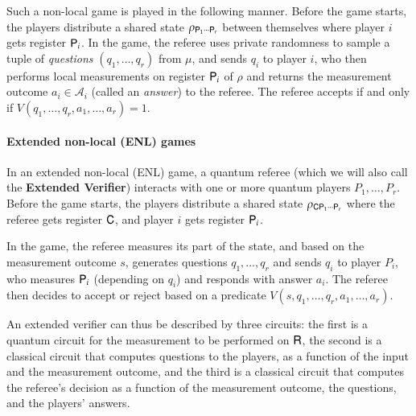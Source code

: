 
Such a non-local game is played in the following manner. Before the game starts, the players distribute a shared state $\rho_{{\mathsf{P}}_1 \cdots {\mathsf{P}}_r}$ between themselves where player $i$ gets register ${\mathsf{P}}_i$. In the game, the referee uses private randomness to sample a tuple of \emph{questions} $(q_1,\ldots,q_r)$ from $\mu$, and sends $q_i$ to player $i$, who then performs local measurements on register ${\mathsf{P}}_i$ of $\rho$ and returns the measurement outcome $a_i \in \mathcal{A}_i$ (called an \emph{answer}) to the referee. The referee accepts if and only if $V(q_1,\ldots,q_r,a_1,\ldots,a_r) = 1$. 


\paragraph{Extended non-local (ENL) games} In an extended non-local (ENL) game, a quantum referee (which we will also call the \textbf{Extended Verifier}) interacts with one or more quantum players $P_1,\ldots,P_r$. Before the game starts, the players distribute a shared state $\rho_{{\mathsf{C}} {\mathsf{P}}_1 \cdots {\mathsf{P}}_r}$ where the referee gets register ${\mathsf{C}}$, and player $i$ gets register ${\mathsf{P}}_i$. 

In the game, the referee measures its part of the state, and based on the measurement outcome $s$, generates questions $q_1,\ldots,q_r$ and sends $q_i$ to player $P_i$, who measures ${\mathsf{P}}_i$ (depending on $q_i$) and  responds with answer $a_i$. The referee then decides to accept or reject based on a predicate $V(s,q_1,\ldots,q_r,a_1,\ldots,a_r)$.

An extended verifier can thus be described by three circuits: the first is a quantum circuit for the measurement to be performed on ${\mathsf{R}}$, the second is a classical circuit that computes questions to the players, as a function of the input and the measurement outcome, and the third is a classical circuit that computes the referee's decision as a function of the measurement outcome, the questions, and the players' answers. 



